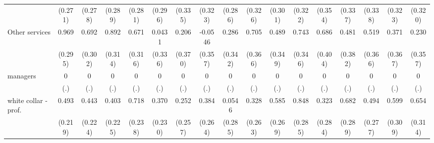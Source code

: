 {\begin{tabular}{l*{16}{c}}
                    &     (0.271)         &     (0.278)         &     (0.289)         &     (0.281)         &     (0.296)         &     (0.335)         &     (0.323)         &     (0.286)         &     (0.326)         &     (0.301)         &     (0.322)         &     (0.354)         &     (0.337)         &     (0.338)         &     (0.323)         &     (0.320)         \\
[1em]
Other services      &       0.969\sym{**} &       0.692\sym{*}  &       0.892\sym{**} &       0.671\sym{*}  &      0.0431         &       0.206         &     -0.0546         &       0.286         &       0.705         &       0.489         &       0.743\sym{*}  &       0.686         &       0.481         &       0.519         &       0.371         &       0.230         \\
                    &     (0.295)         &     (0.302)         &     (0.314)         &     (0.316)         &     (0.336)         &     (0.370)         &     (0.357)         &     (0.342)         &     (0.366)         &     (0.349)         &     (0.346)         &     (0.404)         &     (0.382)         &     (0.366)         &     (0.367)         &     (0.357)         \\
[1em]
managers            &           0         &           0         &           0         &           0         &           0         &           0         &           0         &           0         &           0         &           0         &           0         &           0         &           0         &           0         &           0         &           0         \\
                    &         (.)         &         (.)         &         (.)         &         (.)         &         (.)         &         (.)         &         (.)         &         (.)         &         (.)         &         (.)         &         (.)         &         (.)         &         (.)         &         (.)         &         (.)         &         (.)         \\
[1em]
white collar - prof.&       0.493\sym{*}  &       0.443\sym{*}  &       0.403         &       0.718\sym{**} &       0.370         &       0.252         &       0.384         &      0.0546         &       0.328         &       0.585\sym{*}  &       0.848\sym{**} &       0.323         &       0.682\sym{*}  &       0.494         &       0.599         &       0.654\sym{*}  \\
                    &     (0.219)         &     (0.224)         &     (0.225)         &     (0.238)         &     (0.230)         &     (0.257)         &     (0.264)         &     (0.285)         &     (0.263)         &     (0.269)         &     (0.285)         &     (0.284)         &     (0.289)         &     (0.277)         &     (0.309)         &     (0.314)         \\

\end{tabular}}
